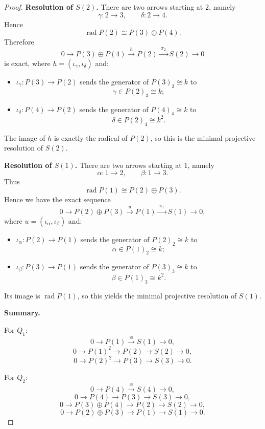 \documentclass[11pt, a4paper]{article}
\begin{document}
\begin{enumerate}[leftmargin=*, label=\textbf{\arabic*.}]
\begin{proof}
    \medskip
    \noindent\textbf{Resolution of $S(2)$.}
    There are two arrows starting at $2$, namely
    \[
    \gamma:2\to 3,
    \qquad
    \delta:2\to 4.
    \]
    Hence
    \[
    \operatorname{rad} P(2)\cong P(3)\oplus P(4).
    \]
    Therefore
    \[
    0 \longrightarrow P(3)\oplus P(4)
    \xrightarrow{\;h\;}
    P(2)
    \xrightarrow{\;\pi_2\;}
    S(2)
    \longrightarrow 0
    \]
    is exact, where $h=(\iota_\gamma,\iota_\delta)$ and:
    \begin{itemize}
        \item $\iota_\gamma:P(3)\to P(2)$ sends the generator of $P(3)_3\cong k$ to
        \[
        \gamma \in P(2)_3\cong k;
        \]
        \item $\iota_\delta:P(4)\to P(2)$ sends the generator of $P(4)_4\cong k$ to
        \[
        \delta \in P(2)_4\cong k^2.
        \]
    \end{itemize}
    The image of $h$ is exactly the radical of $P(2)$, so this is the minimal projective resolution of $S(2)$.
    
    \medskip
    \noindent\textbf{Resolution of $S(1)$.}
    There are two arrows starting at $1$, namely
    \[
    \alpha:1\to 2,
    \qquad
    \beta:1\to 3.
    \]
    Thus
    \[
    \operatorname{rad} P(1)\cong P(2)\oplus P(3).
    \]
    Hence we have the exact sequence
    \[
    0 \longrightarrow P(2)\oplus P(3)
    \xrightarrow{\;u\;}
    P(1)
    \xrightarrow{\;\pi_1\;}
    S(1)
    \longrightarrow 0,
    \]
    where $u=(\iota_\alpha,\iota_\beta)$ and:
    \begin{itemize}
        \item $\iota_\alpha:P(2)\to P(1)$ sends the generator of $P(2)_2\cong k$ to
        \[
        \alpha \in P(1)_2\cong k;
        \]
        \item $\iota_\beta:P(3)\to P(1)$ sends the generator of $P(3)_3\cong k$ to
        \[
        \beta \in P(1)_3\cong k^2.
        \]
    \end{itemize}
    Its image is $\operatorname{rad} P(1)$, so this yields the minimal projective resolution of $S(1)$.
    
    \bigskip
    \noindent\textbf{Summary.}
    
    For $Q_1$:
    \[
    0\to P(1)\xrightarrow{\cong} S(1)\to 0,
    \]
    \[
    0\to P(1)^2\to P(2)\to S(2)\to 0,
    \]
    \[
    0\to P(2)^2\to P(3)\to S(3)\to 0.
    \]
    
    For $Q_2$:
    \[
    0\to P(4)\xrightarrow{\cong} S(4)\to 0,
    \]
    \[
    0\to P(4)\to P(3)\to S(3)\to 0,
    \]
    \[
    0\to P(3)\oplus P(4)\to P(2)\to S(2)\to 0,
    \]
    \[
    0\to P(2)\oplus P(3)\to P(1)\to S(1)\to 0.
    \]
    

\end{proof}
\end{enumerate}
\end{document}
